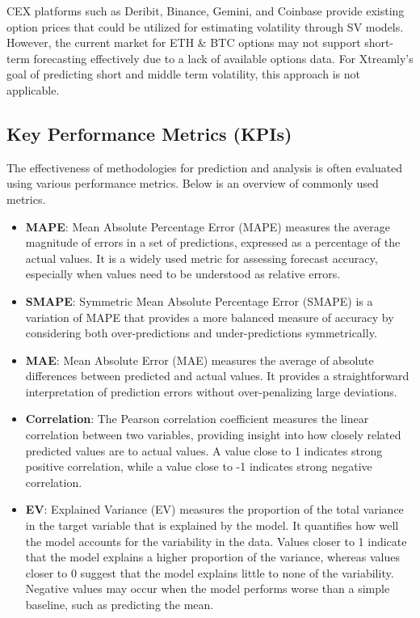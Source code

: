 \documentclass[8pt]{article}
\begin{document}
\begin{multicols}{2}
		CEX platforms such as Deribit, Binance, Gemini, and Coinbase provide existing option prices that could be utilized for estimating volatility through SV models. However, the current market for ETH \& BTC options may not support short-term forecasting effectively due to a lack of available options data. For Xtreamly’s goal of predicting short and middle term volatility, this approach is not applicable.
		
		\subsection{Key Performance Metrics (KPIs)}
		The effectiveness of methodologies for prediction and analysis is often evaluated using various performance metrics. Below is an overview of commonly used metrics.
		\begin{itemize}
			\item \textbf{MAPE}: Mean Absolute Percentage Error (MAPE) measures the average magnitude of errors in a set of predictions, expressed as a percentage of the actual values. It is a widely used metric for assessing forecast accuracy, especially when values need to be understood as relative errors.
			\item \textbf{SMAPE}: Symmetric Mean Absolute Percentage Error (SMAPE) is a variation of MAPE that provides a more balanced measure of accuracy by considering both over-predictions and under-predictions symmetrically.
			\item \textbf{MAE}: Mean Absolute Error (MAE) measures the average of absolute differences between predicted and actual values. It provides a straightforward interpretation of prediction errors without over-penalizing large deviations.
			\item \textbf{Correlation}: The Pearson correlation coefficient measures the linear correlation between two variables, providing insight into how closely related predicted values are to actual values. A value close to 1 indicates strong positive correlation, while a value close to -1 indicates strong negative correlation.
			\item \textbf{EV}: Explained Variance (EV) measures the proportion of the total variance in the target variable that is explained by the model. It quantifies how well the model accounts for the variability in the data. Values closer to 1 indicate that the model explains a higher proportion of the variance, whereas values closer to 0 suggest that the model explains little to none of the variability. Negative values may occur when the model performs worse than a simple baseline, such as predicting the mean.

\end{itemize}
\end{multicols}
\end{document}
